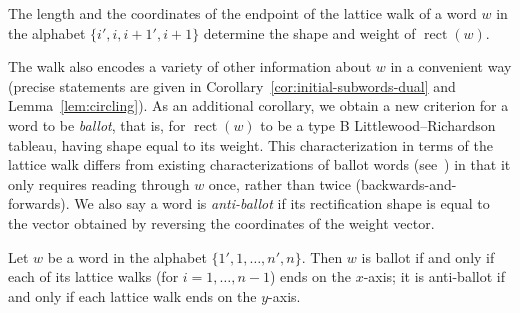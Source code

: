 \documentclass[ALCO,ThmDefs,Unicode,epreuves]{cedram}
\DeclareMathOperator{\rectify}{rect}
\newcommand{\defn}[1]{\emph{#1}}
\begin{document}
\begin{theorem}
The length and the coordinates of the endpoint of the lattice walk of a word $w$ in the alphabet $\{i',i,i{+}1',i{+}1\}$ determine the shape and weight of $\rectify(w)$.
\end{theorem}
The walk also encodes a variety of other information about $w$ in a convenient way (precise statements are given in Corollary~\ref{cor:initial-subwords-dual} and Lemma~\ref{lem:circling}). As an additional corollary, we obtain a new criterion for a word to be \defn{ballot}, that is, for $\rectify(w)$ to be a type B Littlewood--Richardson tableau, having shape equal to its weight. This characterization in terms of the lattice walk differs from existing characterizations of ballot words (see~\cite{Stembridge}) in that it only requires reading through $w$ once, rather than twice (backwards-and-forwards). We also say a word is \defn{anti-ballot} if its rectification shape is equal to the vector obtained by reversing the coordinates of the weight vector.


\begin{theorem} \label{thm:lattice-walk-main}
Let $w$ be a word in the alphabet $\{1',1, \ldots, n',n\}$. Then $w$ is ballot if and only if each of its lattice walks (for $i=1, \ldots, n-1$) ends on the $x$-axis; it is anti-ballot if and only if each lattice walk ends on the $y$-axis.
\end{theorem}
\end{document}
